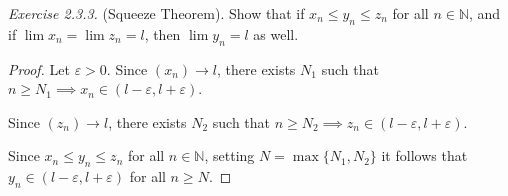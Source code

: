 \noindent
\emph{Exercise 2.3.3.} (Squeeze Theorem). Show that if $x_n \leq y_n \leq z_n$ for all $n \in \mathbb{N}$, and if $\lim x_n = \lim z_n = l$, then $\lim y_n = l$ as well.
\begin{proof}
Let $\varepsilon > 0$.  Since $(x_n) \to l$, there exists $N_{1}$ such that $n \geq N_{1} \implies x_n \in (l- \varepsilon, l + \varepsilon)$.

Since $(z_n) \to l$, there exists $N_{2}$ such that $n \geq N_{2} \implies z_n \in (l- \varepsilon, l + \varepsilon)$.

Since $x_n \leq y_n \leq z_n$ for all $n \in \mathbb{N}$, setting $N = \max \{N_1, N_2\}$ it follows that $y_n \in (l-\varepsilon, l + \varepsilon)$ for all $n \geq N$.

\end{proof}

\smallskip



